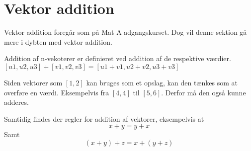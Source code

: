 \section{Vektor addition}\label{sec:addition}
Vektor addition foregår som på Mat A adgangskurset.
Dog vil denne sektion gå mere i dybten med vektor addition.


\begin{frdef}[KLEIN s.
69]
	Addition af n-vekoterer er definieret ved addition af de respektive værdier.\\
	$[u1,u2,u3] + [v1,v2,v3] = [u1+v1, u2+v2, u3+v3]$
\end{frdef}

Siden vektorer som $[1,2]$ kan bruges som et opslag, kan den tænkes som at overføre en værdi.
Eksempelvis fra $[4,4]$ til $[5,6]$.
Derfor må den også kunne adderes.

Samtidig findes der regler for addition af vektorer, eksempelvis at
\begin{equation}
	x+y=y+x
\end{equation}
Samt
\begin{equation}
	(x+y)+z=x+(y+z)
\end{equation}